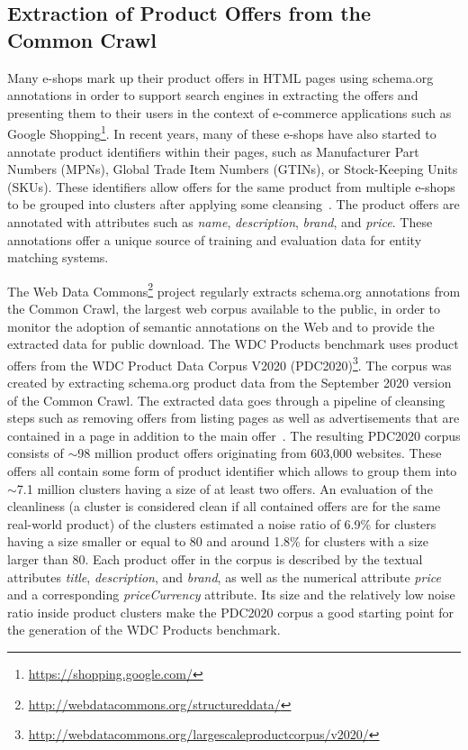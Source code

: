 \documentclass[sigconf,edbt]{acmart-edbt2024}
\begin{document}
\subsection{Extraction of Product Offers from the Common Crawl}
\label{subsec:extractionCC}

Many e-shops mark up their product offers in HTML pages using schema.org annotations in order to support search engines in extracting the offers and presenting them to their users in the context of e-commerce applications such as Google Shopping\footnote{\url{https://shopping.google.com/}}. In recent years, many of these e-shops have also started to annotate product identifiers within their pages, such as Manufacturer Part Numbers (MPNs), Global Trade
Item Numbers (GTINs), or Stock-Keeping Units (SKUs). These identifiers allow offers for the same product from multiple e-shops to be grouped into clusters after applying some cleansing~\cite{primpeli2019wdc}. The product offers are annotated with attributes such as \textit{name}, \textit{description}, \textit{brand}, and \textit{price}. These annotations offer a unique source of training and evaluation data for entity matching systems. 

The Web Data Commons\footnote{\url{http://webdatacommons.org/structureddata/}} project regularly extracts schema.org annotations from the Common Crawl, the largest web corpus available to the public, in order to monitor the adoption of semantic annotations on the Web and to provide the extracted data for public download.
The WDC Products benchmark uses product offers from the WDC Product Data Corpus V2020 (PDC2020)\footnote{\url{http://webdatacommons.org/largescaleproductcorpus/v2020/}}. The corpus was created by extracting schema.org product data from the September 2020 version of the Common Crawl. The extracted data goes through a pipeline of cleansing steps such as removing offers from listing pages as well as advertisements that are contained in a page in addition to the main offer~\cite{primpeli2019wdc}.  The resulting PDC2020 corpus consists of $\sim$98 million product offers originating from 603,000 websites. These offers all contain some form of product identifier which allows to group them into $\sim$7.1 million clusters having a size of at least two offers. An evaluation of the cleanliness (a cluster is considered clean if all contained offers are for the same real-world product) of the clusters estimated a noise ratio of 6.9\% for clusters having a size smaller or equal to 80 and around 1.8\% for clusters with a size larger than 80. Each product offer in the corpus is described by the textual attributes \textit{title}, \textit{description}, and \textit{brand}, as well as the numerical attribute \textit{price} and a corresponding \textit{priceCurrency} attribute. Its size and the relatively low noise ratio inside product clusters make the PDC2020 corpus a good starting point for the generation of the WDC Products benchmark. 
\end{document}
